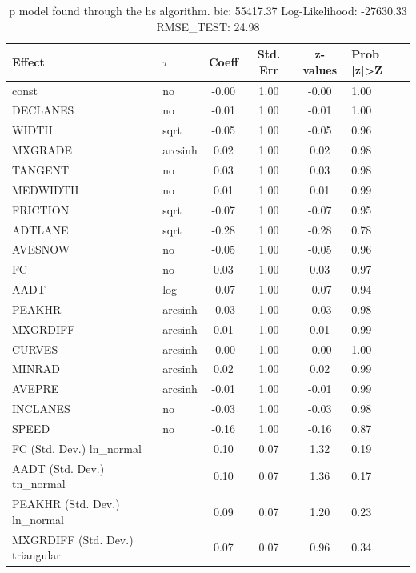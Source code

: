 \begin{table}
	\caption{p model found through the hs algorithm. bic: 55417.37 Log-Likelihood: -27630.33 RMSE_TEST: 24.98}
	\begin{center}
		\begin{tabular}{|l|l|c|c|c|l|}
			\hline
			Effect & $\tau$ & Coeff & Std. Err & z-values & Prob |z|>Z \\
			\hline
			const & no & -0.00 & 1.00 & -0.00 & 1.00 \\
			\hline
			DECLANES & no & -0.01 & 1.00 & -0.01 & 1.00 \\
			\hline
			WIDTH & sqrt & -0.05 & 1.00 & -0.05 & 0.96 \\
			\hline
			MXGRADE & arcsinh & 0.02 & 1.00 & 0.02 & 0.98 \\
			\hline
			TANGENT & no & 0.03 & 1.00 & 0.03 & 0.98 \\
			\hline
			MEDWIDTH & no & 0.01 & 1.00 & 0.01 & 0.99 \\
			\hline
			FRICTION & sqrt & -0.07 & 1.00 & -0.07 & 0.95 \\
			\hline
			ADTLANE & sqrt & -0.28 & 1.00 & -0.28 & 0.78 \\
			\hline
			AVESNOW & no & -0.05 & 1.00 & -0.05 & 0.96 \\
			\hline
			FC & no & 0.03 & 1.00 & 0.03 & 0.97 \\
			\hline
			AADT & log & -0.07 & 1.00 & -0.07 & 0.94 \\
			\hline
			PEAKHR & arcsinh & -0.03 & 1.00 & -0.03 & 0.98 \\
			\hline
			MXGRDIFF & arcsinh & 0.01 & 1.00 & 0.01 & 0.99 \\
			\hline
			CURVES & arcsinh & -0.00 & 1.00 & -0.00 & 1.00 \\
			\hline
			MINRAD & arcsinh & 0.02 & 1.00 & 0.02 & 0.99 \\
			\hline
			AVEPRE & arcsinh & -0.01 & 1.00 & -0.01 & 0.99 \\
			\hline
			INCLANES & no & -0.03 & 1.00 & -0.03 & 0.98 \\
			\hline
			SPEED & no & -0.16 & 1.00 & -0.16 & 0.87 \\
			\hline
			FC (Std. Dev.) ln_normal &  & 0.10 & 0.07 & 1.32 & 0.19 \\
			\hline
			AADT (Std. Dev.) tn_normal &  & 0.10 & 0.07 & 1.36 & 0.17 \\
			\hline
			PEAKHR (Std. Dev.) ln_normal &  & 0.09 & 0.07 & 1.20 & 0.23 \\
			\hline
			MXGRDIFF (Std. Dev.) triangular &  & 0.07 & 0.07 & 0.96 & 0.34 \\

\end{tabular}
\end{center}
\end{table}
